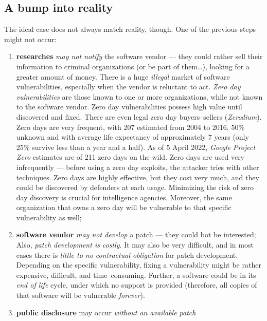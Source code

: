 \documentclass[10pt]{extreport}
\begin{document}
\subsection{A bump into reality}

The ideal case does not always match reality, though. One of the previous steps
might not occur:
\begin{enumerate}
    \item \textbf{researches} \emph{may not notify} the software vendor --- they
        could rather sell their information to criminal organizations (or be
        part of them\dots), looking for a greater amount of money. There is a
        huge \emph{illegal} market of software vulnerabilities, especially when
        the vendor is reluctant to act. \emph{Zero day vulnerabilities} are
        those known to one or more organizations, while not known to the
        software vendor. Zero day vulnerabilities possess high value until
        discovered and fixed. There are even legal zero day buyers--sellers
        (\emph{Zerodium}). Zero days are very frequent, with 207 estimated from
        2004 to 2016, 50\% unknown and with average life expectancy of
        approximately 7 years (only 25\% survive less than a year and a half).
        As of 5 April 2022, \emph{Google Project Zero} estimates are of 211
        zero days on the wild. Zero days are used very infrequently --- before
        using a zero day exploits, the attacker tries with other techniques.
        Zero days are highly effective, but they cost very much, and they could
        be discovered by defenders at each usage. Minimizing the risk of zero
        day discovery is crucial for intelligence agencies. Moreover, the same
        organization that owns a zero day will be vulnerable to that specific
        vulnerability as well;
    \item \textbf{software vendor} \emph{may not develop} a patch --- they could
        bot be interested; Also, \emph{patch development is costly}. It may
        also be very difficult, and in most cases there is \emph{little to no
        contractual obligation} for patch development. Depending on the
        specific vulnerability, fixing a vulnerability might be rather
        expensive, difficult, and time--consuming. Further, a software could be
        in its \emph{end of life} cycle, under which no support is provided
        (therefore, all copies of that software will be vulnerable
        \emph{forever}).
    \item \textbf{public disclosure} may occur \emph{without an available patch}

\end{enumerate}
\end{document}
